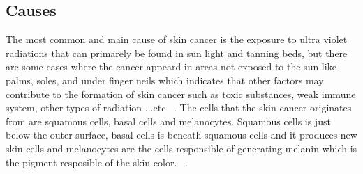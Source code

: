     \subsection{Causes}
        The most common and main cause of skin cancer is the exposure to ultra violet ~\cite{mayo2020, scf2022, nhs2020} radiations that can primarely be found in sun light and tanning beds, but there are some cases where the cancer appeard in areas not exposed to the sun like palms, soles, and under finger neils which indicates that other factors may contribute to the formation of skin cancer such as toxic substances, weak immune system, other types of radiation ...etc ~\cite{mayo2020}.
        The cells that the skin cancer originates from are squamous cells, basal cells and melanocytes. Squamous cells is just below the outer surface, basal cells is beneath squamous cells and it produces new skin cells and melanocytes are the cells responsible of generating melanin which is the pigment resposible of the skin color. ~\cite{mayo2020}.


